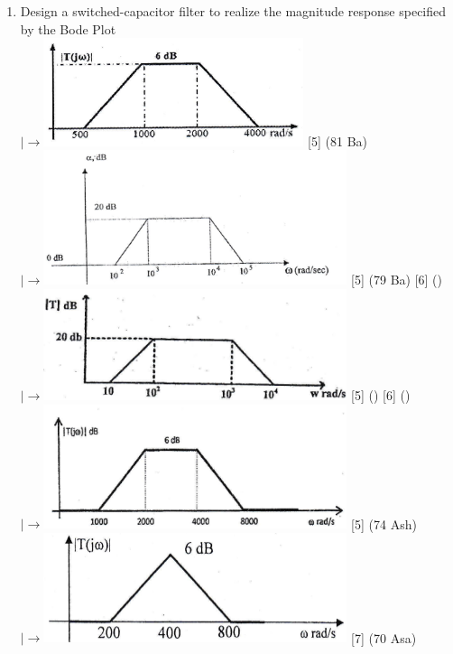 \documentclass[12pt]{article}
\newcommand{\lb}{\\$\left|\rightarrow\right.$}
\begin{document}
\begin{enumerate}[topsep=0pt, noitemsep]
			\item Design a switched-capacitor filter to realize the magnitude response specified by the Bode Plot
			\lb\includegraphics[width=3in]{./pics/fd_12} \hfill [5] (81 Ba)
			\lb \includegraphics[width=3.5in]{./pics/fd_16} \hfill [5] (79 Ba) [6] ()
			\lb \includegraphics[width=3.5in]{./pics/fd_18} \hfill [5] () [6] ()
			\lb \includegraphics[width=3.5in]{./pics/fd_19} \hfill [5] (74 Ash)
			\lb \includegraphics[width=3.5in]{./pics/fd_23} \hfill [7] (70 Asa)
		\end{enumerate}
\end{document}
